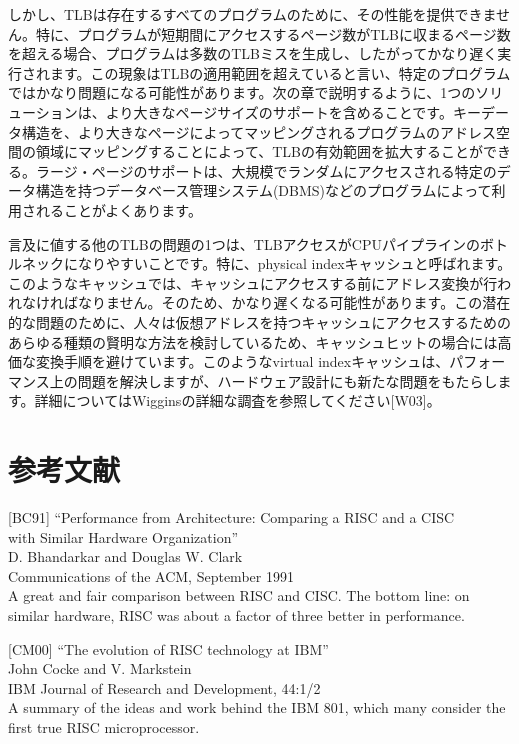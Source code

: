 しかし、TLBは存在するすべてのプログラムのために、その性能を提供できません。特に、プログラムが短期間にアクセスするページ数がTLBに収まるページ数を超える場合、プログラムは多数のTLBミスを生成し、したがってかなり遅く実行されます。この現象はTLBの適用範囲を超えていると言い、特定のプログラムではかなり問題になる可能性があります。次の章で説明するように、1つのソリューションは、より大きなページサイズのサポートを含めることです。キーデータ構造を、より大きなページによってマッピングされるプログラムのアドレス空間の領域にマッピングすることによって、TLBの有効範囲を拡大することができる。ラージ・ページのサポートは、大規模でランダムにアクセスされる特定のデータ構造を持つデータベース管理システム(DBMS)などのプログラムによって利用されることがよくあります。

言及に値する他のTLBの問題の1つは、TLBアクセスがCPUパイプラインのボトルネックになりやすいことです。特に、physical
indexキャッシュと呼ばれます。このようなキャッシュでは、キャッシュにアクセスする前にアドレス変換が行われなければなりません。そのため、かなり遅くなる可能性があります。この潜在的な問題のために、人々は仮想アドレスを持つキャッシュにアクセスするためのあらゆる種類の賢明な方法を検討しているため、キャッシュヒットの場合には高価な変換手順を避けています。このようなvirtual
indexキャッシュは、パフォーマンス上の問題を解決しますが、ハードウェア設計にも新たな問題をもたらします。詳細についてはWigginsの詳細な調査を参照してください{[}W03{]}。

\hypertarget{ux53c2ux8003ux6587ux732e-11}{%
\section*{参考文献}\label{ux53c2ux8003ux6587ux732e-11}}

{[}BC91{]} ``Performance from Architecture: Comparing a RISC and a
CISC\\
with Similar Hardware Organization''\\
D. Bhandarkar and Douglas W. Clark\\
Communications of the ACM, September 1991\\
A great and fair comparison between RISC and CISC. The bottom line: on
similar hardware, RISC was about a factor of three better in
performance.

{[}CM00{]} ``The evolution of RISC technology at IBM''\\
John Cocke and V. Markstein\\
IBM Journal of Research and Development, 44:1/2\\
A summary of the ideas and work behind the IBM 801, which many consider
the first true RISC microprocessor.

